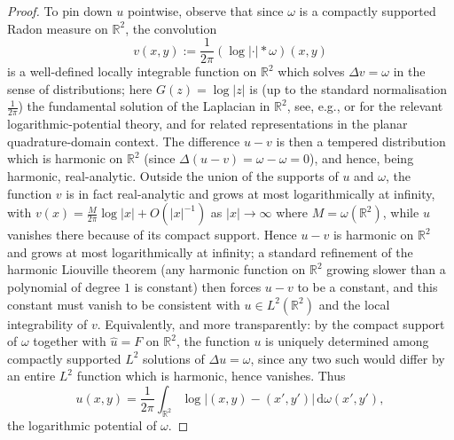 \documentclass[a4paper,11pt,reqno]{amsart}
\numberwithin{equation}{section}
\theoremstyle{plain} %
\theoremstyle{definition} %
\theoremstyle{remark}
\newcommand{\R}{\mathbb{R}}
\begin{document}
\begin{proof}
To pin down $u$ pointwise, observe that since $\omega$ is a compactly
supported Radon measure on $\R^2$, the convolution
\[
v(x,y) := \frac{1}{2\pi}(\log|\cdot|*\omega)(x,y)
\]
is a well-defined locally integrable function on $\R^2$ which solves
$\Delta v = \omega$ in the sense of distributions; here $G(z)=\log|z|$ is
(up to the standard normalisation $\tfrac{1}{2\pi}$) the fundamental solution
of the Laplacian in $\R^2$, see, e.g., \cite[Ch.~II]{Garnett} or
\cite[\S 6.2]{Folland} for the relevant logarithmic-potential theory, and
\cite{Aharonov-Schiffer-Zalcman} for related representations in the planar
quadrature-domain context. The difference $u-v$ is then a tempered
distribution which is harmonic on $\R^2$ (since
$\Delta(u-v)=\omega-\omega=0$), and hence, being harmonic, real-analytic.
Outside the union of the supports of $u$ and $\omega$, the function $v$ is
in fact real-analytic and grows at most logarithmically at infinity, with
$v(x)=\frac{M}{2\pi}\log|x|+O(|x|^{-1})$ as $|x|\to\infty$ where
$M=\omega(\R^2)$, while $u$ vanishes there because of its compact support.
Hence $u-v$ is harmonic on $\R^2$ and grows at most logarithmically at
infinity; a standard refinement of the harmonic Liouville theorem (any
harmonic function on $\R^2$ growing slower than a polynomial of degree $1$
is constant) then forces $u-v$ to be a constant, and this constant must
vanish to be consistent with $u\in L^2(\R^2)$ and the local integrability
of $v$. Equivalently, and more transparently: by the compact support of
$\omega$ together with $\widehat u = F$ on $\R^2$, the function $u$ is
uniquely determined among compactly supported $L^2$ solutions of
$\Delta u = \omega$, since any two such would differ by an entire $L^2$
function which is harmonic, hence vanishes. Thus
\[
u(x,y)=\frac{1}{2\pi}\int_{\R^2}\log|(x,y)-(x',y')|\,\mathrm{d}\omega(x',y'),
\]
the logarithmic potential of $\omega$.


\end{proof}
\end{document}
